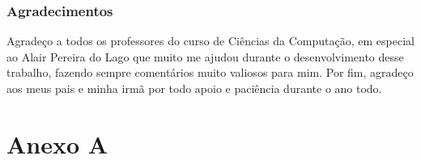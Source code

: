 \documentclass[a4paper,12pt]{article}
\begin{document}
\subsubsection {Agradecimentos}
\label {sec:agradecimentos}

Agradeço a todos os professores do curso de Ciências da Computação, em especial ao Alair Pereira do Lago que muito me ajudou durante o desenvolvimento desse trabalho, fazendo sempre comentários muito valiosos para mim. Por fim, agradeço aos meus pais e minha irmã por todo apoio e paciência durante o ano todo.

\newpage

\section {Anexo A}
\label {sec:anexo_A}
\end{document}
